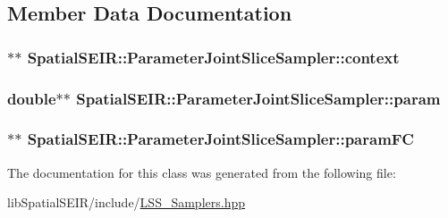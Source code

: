 \subsection{Member Data Documentation}
\hypertarget{classSpatialSEIR_1_1ParameterJointSliceSampler_adc70f8f5143b09aa830aa7b1c12c0853}{
\subsubsection[{context}]{$\ast$$\ast$ Spatial\-S\-E\-I\-R\-::\-Parameter\-Joint\-Slice\-Sampler\-::context}}\label{classSpatialSEIR_1_1ParameterJointSliceSampler_adc70f8f5143b09aa830aa7b1c12c0853}
\hypertarget{classSpatialSEIR_1_1ParameterJointSliceSampler_a405ce2949e75688013da196ecc139fa6}{
\subsubsection[{param}]{\setlength{\rightskip}{0pt plus 5cm}double$\ast$$\ast$ Spatial\-S\-E\-I\-R\-::\-Parameter\-Joint\-Slice\-Sampler\-::param}}\label{classSpatialSEIR_1_1ParameterJointSliceSampler_a405ce2949e75688013da196ecc139fa6}
\hypertarget{classSpatialSEIR_1_1ParameterJointSliceSampler_a898ccd247b2ef346005ac437a600f4d4}{
\subsubsection[{param\-F\-C}]{$\ast$$\ast$ Spatial\-S\-E\-I\-R\-::\-Parameter\-Joint\-Slice\-Sampler\-::param\-F\-C}}\label{classSpatialSEIR_1_1ParameterJointSliceSampler_a898ccd247b2ef346005ac437a600f4d4}


The documentation for this class was generated from the following file\-:\begin{DoxyCompactItemize}
\item 
lib\-Spatial\-S\-E\-I\-R/include/\hyperlink{LSS__Samplers_8hpp}{L\-S\-S\-\_\-\-Samplers.\-hpp}\end{DoxyCompactItemize}
